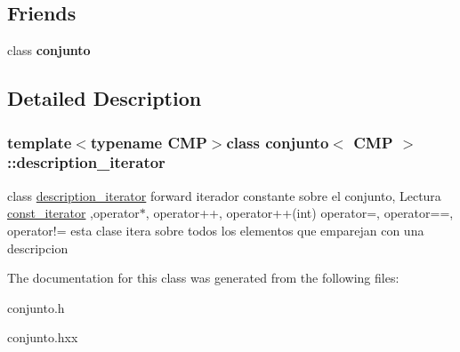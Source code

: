 \subsection*{Friends}
\begin{DoxyCompactItemize}
\item 
\hypertarget{classconjunto_1_1description__iterator_a3d79521e8bdd4a7fcb97da3f383fe5da}{}class {\bfseries conjunto}\label{classconjunto_1_1description__iterator_a3d79521e8bdd4a7fcb97da3f383fe5da}

\end{DoxyCompactItemize}


\subsection{Detailed Description}
\subsubsection*{template$<$typename C\+M\+P$>$class conjunto$<$ C\+M\+P $>$\+::description\+\_\+iterator}

class \hyperlink{classconjunto_1_1description__iterator}{description\+\_\+iterator} forward iterador constante sobre el conjunto, Lectura \hyperlink{classconjunto_1_1const__iterator}{const\+\_\+iterator} ,operator$\ast$, operator++, operator++(int) operator=, operator==, operator!= esta clase itera sobre todos los elementos que emparejan con una descripcion 

The documentation for this class was generated from the following files\+:\begin{DoxyCompactItemize}
\item 
conjunto.\+h\item 
conjunto.\+hxx\end{DoxyCompactItemize}
